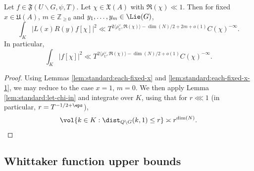 \begin{lemma}\label{lem:scratch-research:let-f-in}
  Let $f \in \mathfrak{F}(U \backslash G, \psi, T)$.  Let $\chi \in \mathfrak{X}(A)$ with $\Re(\chi) \ll 1$.  Then for fixed $x \in \mathfrak{U}(A)$, $m \in \mathbb{Z}_{\geq 0}$ and $y_1,\dotsc,y_m \in \Lie(G)$,
  \begin{equation*}
    \int_K \left\lvert L(x) R(y) f[\chi] \right\rvert^2 \ll T^{2 \langle \rho_U^\vee, \Re(\chi) \rangle -\dim(N)/2 + 2 m + o(1)} C(\chi)^{-\infty}.
  \end{equation*}
  In particular,
  \begin{equation}\label{eq:int_k-fchi2-ll}
    \int_K \left\lvert f[\chi] \right\rvert^2 \ll T^{2 \langle \rho_U^\vee, \Re(\chi) \rangle -\dim(N)/2 + o(1)} C(\chi)^{-\infty}.
  \end{equation}
\end{lemma}
\begin{proof}
  Using Lemmas \ref{lem:standard:each-fixed-x} and \ref{lem:standard:each-fixed-x-1}, we may reduce to the case $x = 1$, $m = 0$.  We then apply Lemma \ref{lem:standard:let-chi-in} and integrate over $K$, using that for $r \lll 1$ (in particular, $r = T^{-1/2+\eps}$),
  \begin{equation*}
    \vol \{k \in K : \dist_{Q \backslash G}(k,1) \leq r \} \asymp r^{\dim(N)}.
  \end{equation*}
\end{proof}


\subsection{Whittaker function upper bounds}\label{sec:whittaker-upper-bounds}

